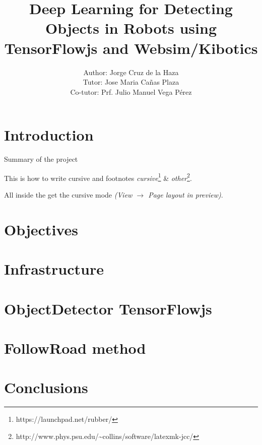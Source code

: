\documentclass[11pt]{article}
\title{\textbf{Deep Learning for Detecting Objects in Robots using TensorFlowjs and Websim/Kibotics}}
\author{Author: Jorge Cruz de la Haza\\
		Tutor: Jose Maria Ca\~nas Plaza\\
		Co-tutor: Prf. Julio Manuel Vega P\'erez}
\date{}
\begin{document}
\maketitle

\section{Introduction}

Summary of the project

This is how to write cursive and footnotes \emph{cursive}\footnote{https://launchpad.net/rubber/} \& \emph{other}\footnote{http://www.phys.psu.edu/{\textasciitilde}collins/software/latexmk-jcc/}.

All inside the {} get the cursive mode \emph{(View $\rightarrow$ Page layout in preview)}.

\section{Objectives}

\section{Infrastructure}

\section{ObjectDetector TensorFlowjs}

\section{FollowRoad method}

\section{Conclusions}
\end{document}
